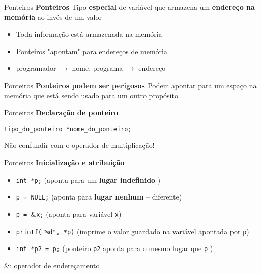 \documentclass[10pt]{beamer}
\subtitle{Aula 4}
\date{13 de novembro de 2019}
\begin{document}
\maketitle

\begin{frame}{Ponteiros}
  \huge
  \textbf{Ponteiros}
  \vfill
  \LARGE
  Tipo \textbf{especial} de variável que armazena um \textbf{endereço na memória} ao invés de um valor
  \vfill
  \large
  \setlength{\leftmargini}{0pt}
  \begin{itemize}
      \item [] Toda informação está armazenada na memória
      \item [] Ponteiros "apontam" para endereços de memória
      \item [] programador $\rightarrow$ nome, programa $\rightarrow$ endereço
  \end{itemize}
\end{frame}

\begin{frame}{Ponteiros}
  \huge
  \textbf{Ponteiros podem ser \alert{perigosos \faExclamationTriangle}}
  \vfill
  \large
  Podem apontar para um espaço na memória que está sendo usado para um outro propósito
\end{frame}

\begin{frame}[fragile]{Ponteiros}
  \huge
  \textbf{Declaração de ponteiro}
  \vfill
  \Large
  \begin{verbatim}
tipo_do_ponteiro *nome_do_ponteiro;
  \end{verbatim}
  \vfill
  \large
  Não confundir com o operador de multiplicação!
\end{frame}

\begin{frame}{Ponteiros}
  \huge
  \textbf{Inicialização e atribuição}
  \vfill
  \large
  \begin{itemize}
    \item \texttt{int *p;} (aponta para um \textbf{lugar indefinido} \faExclamationTriangle)
    \item \texttt{p = NULL;} (aponta para \textbf{lugar nenhum} -- diferente)
    \item \texttt{p = }\&\texttt{x;} (aponta para variável \texttt{x})
    \item \texttt{printf("\%d", *p)} (imprime o valor guardado na variável apontada por \texttt{p})
    \item \texttt{int *p2 = p;} (ponteiro \texttt{p2} aponta para o mesmo lugar que \texttt{p} \faExclamationTriangle)
  \end{itemize}
  \vfill
  \large
  \&: operador de endereçamento
\end{frame}
\end{document}
